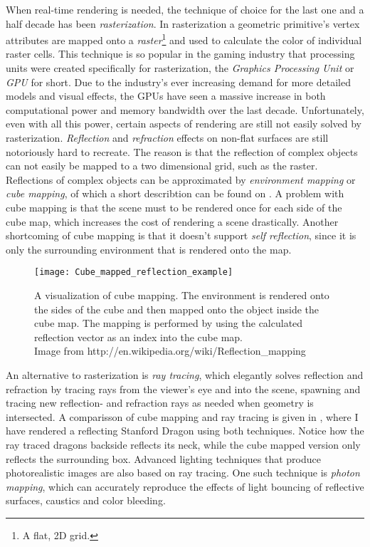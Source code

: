 When real-time rendering is needed, the technique of choice for the last one and
a half decade has been \textit{rasterization}. In rasterization a geometric
primitive's vertex attributes are mapped onto a \textit{raster}\footnote{A flat,
  2D grid.} and used to calculate the color of individual raster cells. This
technique is so popular in the gaming industry that processing units were
created specifically for rasterization, the \textit{Graphics Processing Unit} or
\textit{GPU} for short. Due to the industry's ever increasing demand for more
detailed models and visual effects, the GPUs have seen a massive increase in
both computational power and memory bandwidth over the last
decade. Unfortunately, even with all this power, certain aspects of rendering are
still not easily solved by rasterization. \textit{Reflection} and
\textit{refraction} effects on non-flat surfaces are still notoriously hard to
recreate. The reason is that the reflection of complex objects can not easily be
mapped to a two dimensional grid, such as the raster. Reflections of complex
objects can be approximated by \textit{environment mapping} or \textit{cube
  mapping}, of which a short describtion can be found on . A
problem with cube mapping is that the scene must to be rendered once for each
side of the cube map, which increases the cost of rendering a scene
drastically. Another shortcoming of cube mapping is that it doesn't support
\textit{self reflection}, since it is only the surrounding environment that is
rendered onto the map.

\begin{figure}
  \centering
  \texttt{[image: Cube\_mapped\_reflection\_example]}

  \vspace{3mm}
  \parbox{9.5cm}{\caption[Cube mapping visualized.]{A visualization of cube
      mapping. The environment is rendered onto the sides of the cube and then
      mapped onto the object inside the cube map. The mapping is performed by
      using the calculated reflection vector as an index into the cube
      map.\\Image from
      http://en.wikipedia.org/wiki/Reflection\_mapping}\label{fig:cubemap}}
\end{figure}


An alternative to rasterization is \textit{ray tracing}, which elegantly solves
reflection and refraction by tracing rays from the viewer's eye and into the
scene, spawning and tracing new reflection- and refraction rays as needed when
geometry is intersected. A comparisson of cube mapping and ray tracing is given
in , where I have rendered a reflecting Stanford
Dragon using both techniques. Notice how the ray traced dragons backside
reflects its neck, while the cube mapped version only reflects the surrounding
box. Advanced lighting techniques that produce photorealistic images are also
based on ray tracing. One such technique is \textit{photon mapping}, which can
accurately reproduce the effects of light bouncing of reflective surfaces,
caustics and color bleeding.

